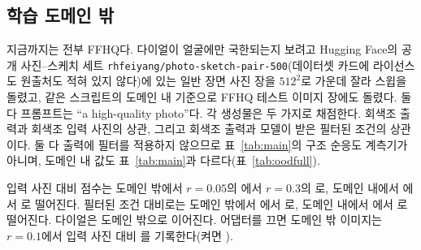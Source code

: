 \documentclass[10pt,twocolumn,a4paper]{article}
\begin{document}
\begin{table}[t]\centering\footnotesize
\setlength{\tabcolsep}{2.5pt}
\caption{Canny 엣지를 받은 사전학습 베이스라인과 $r{=}0.1$의 우리 어댑터. 같은 테스트
500장과 캡션, 50스텝, CFG 7.5, 시드 2026이다. 파라미터는 ControlNet-Canny와 우리는 학습
파라미터, T2I-Adapter는 곁가지 네트워크 파라미터다. 샘플러가 다르므로 각 행은 동작점이며
동일 조건 비교가 아니다.}
\label{tab:baselines}
\end{table}

\subsection{학습 도메인 밖}
\label{sec:ood}

지금까지는 전부 FFHQ다. 다이얼이 얼굴에만 국한되는지 보려고 Hugging Face의 공개
사진--스케치 세트 \texttt{rhfeiyang/photo-sketch-pair-500}(데이터셋 카드에 라이선스도
원출처도 적혀 있지 않다)에 있는 일반 장면 사진
\oodN{}장을 $512^2$로 가운데 잘라 스윕을 돌렸고, 같은 스크립트의 도메인 내 기준으로 FFHQ
테스트 이미지 \oodN{}장에도 돌렸다. 둘 다 프롬프트는 ``a high-quality photo''다. 각
생성물은 두 가지로 채점한다. 회색조 출력과 회색조 입력 사진의 상관, 그리고 회색조 출력과
모델이 받은 필터된 조건의 상관이다. 둘 다 출력에 필터를 적용하지 않으므로 표~\ref{tab:main}의
구조 순응도 계측기가 아니며, 도메인 내 값도 표~\ref{tab:main}과 다르다(표~\ref{tab:oodfull}).

입력 사진 대비 점수는 도메인 밖에서 $r{=}0.05$의 \oodOodZeroFive{}에서 $r{=}0.3$의
\oodOodThreeZero{}로, 도메인 내에서 \oodIndZeroFive{}에서 \oodIndThreeZero{}로 떨어진다.
필터된 조건 대비로는 도메인 밖에서 \oodOodFZeroFive{}에서 \oodOodFThreeZero{}로, 도메인
내에서 \oodIndFZeroFive{}에서 \oodIndFThreeZero{}로 떨어진다. 다이얼은 도메인 밖으로
이어진다. 어댑터를 끄면 도메인 밖 이미지는 $r{=}0.1$에서 입력 사진 대비 \oodOffOneZero{}를
기록한다(켜면 \oodOodOneZero{}).
\end{document}
